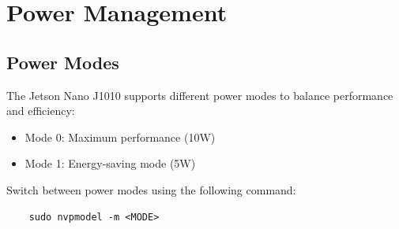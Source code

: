 %
%

\chapter{Power Management}

\section{Power Modes}
The Jetson Nano J1010 supports different power modes to balance performance and efficiency:
\begin{itemize}[label=--,left=1.5em]
	\item Mode 0: Maximum performance (10W)
	\item Mode 1: Energy-saving mode (5W)
\end{itemize}

Switch between power modes using the following command:
\begin{verbatim}
	sudo nvpmodel -m <MODE>
\end{verbatim}



